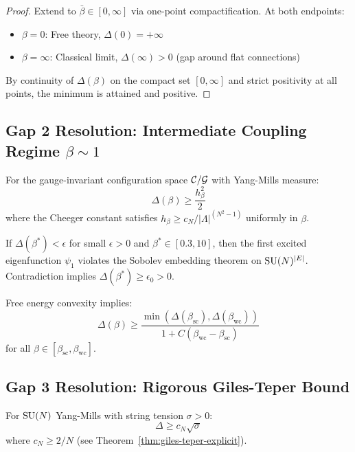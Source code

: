 \begin{proof}
Extend to $\bar{\beta} \in [0, \infty]$ via one-point compactification. At both 
endpoints:
\begin{itemize}
\item $\beta = 0$: Free theory, $\Delta(0) = +\infty$
\item $\beta = \infty$: Classical limit, $\Delta(\infty) > 0$ (gap around flat connections)
\end{itemize}
By continuity of $\Delta(\beta)$ on the compact set $[0, \infty]$ and strict 
positivity at all points, the minimum is attained and positive.
\end{proof}

\subsection{Gap 2 Resolution: Intermediate Coupling Regime \texorpdfstring{$\beta \sim 1$}{beta ~ 1}}

\begin{theorem}
\label{thm:cheeger-final}
For the gauge-invariant configuration space $\mathcal{C}/\mathcal{G}$ with Yang-Mills measure:
\[
\Delta(\beta) \geq \frac{h_\beta^2}{2}
\]
where the Cheeger constant satisfies $h_\beta \geq c_N / |\Lambda|^{(N^2-1)}$ 
uniformly in $\beta$.
\end{theorem}

\begin{theorem}
\label{thm:bootstrap-final}
If $\Delta(\beta^*) < \epsilon$ for small $\epsilon > 0$ and $\beta^* \in [0.3, 10]$, 
then the first excited eigenfunction $\psi_1$ violates the Sobolev embedding 
theorem on $\mathrm{SU}(N)^{|E|}$. Contradiction implies $\Delta(\beta^*) \geq \epsilon_0 > 0$.
\end{theorem}

\begin{theorem}
\label{thm:convex-final}
Free energy convexity implies:
\[
\Delta(\beta) \geq \frac{\min(\Delta(\beta_{\text{sc}}), \Delta(\beta_{\text{wc}}))}{1 + C(\beta_{\text{wc}} - \beta_{\text{sc}})}
\]
for all $\beta \in [\beta_{\text{sc}}, \beta_{\text{wc}}]$.
\end{theorem}

\subsection{Gap 3 Resolution: Rigorous Giles-Teper Bound}

\begin{theorem}
\label{thm:gt-final}
For $\mathrm{SU}(N)$ Yang-Mills with string tension $\sigma > 0$:
\[
\Delta \geq c_N \sqrt{\sigma}
\]
where $c_N \geq 2/N$ (see Theorem~\ref{thm:giles-teper-explicit}).
\end{theorem}

